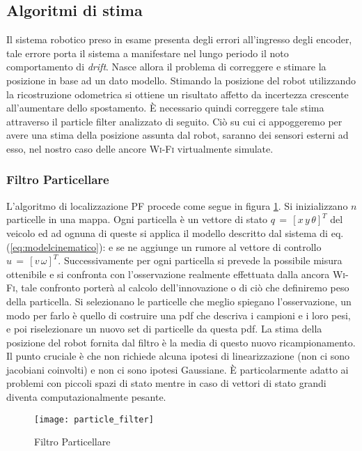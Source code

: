 \subsection{Algoritmi di stima}
Il sistema robotico preso in esame presenta degli errori all'ingresso degli
encoder, tale errore porta il sistema a manifestare nel lungo periodo il noto
comportamento di \emph{drift}.
Nasce allora il problema di correggere e stimare la posizione in base ad un dato
modello.
Stimando la posizione del robot utilizzando la ricostruzione odometrica si
ottiene un risultato affetto da incertezza crescente all'aumentare dello
spostamento.
È necessario quindi correggere tale stima attraverso il particle
filter\cite{newman2003} analizzato di seguito.
Ciò su cui ci appoggeremo per avere una stima della posizione assunta dal robot,
saranno dei sensori esterni ad esso, nel nostro caso delle ancore \textsc{Wi-Fi}
virtualmente simulate.

\subsubsection{Filtro Particellare}
L'algoritmo di localizzazione PF procede come segue in figura
\ref{fig:particle filter}. Si inizializzano $n$ particelle in una mappa.
Ogni particella è un vettore di stato $q\,=\,[x \, y \, \theta]^{T}$ del veicolo
ed ad ognuna di queste si applica il modello descritto dal sistema di eq.
(\ref{eq:modelcinematico}): e se ne aggiunge un rumore al vettore di
controllo $u\,=\,[v \, \omega]^{T}$.
Successivamente per ogni particella si prevede la possibile misura ottenibile e
si confronta con l'osservazione realmente effettuata dalla ancora
\textsc{Wi-Fi}, tale confronto porterà al calcolo dell'innovazione o di ciò che
definiremo peso della particella.
Si selezionano le particelle che meglio spiegano l'osservazione, un modo per
farlo è quello di costruire una pdf che descriva i campioni e i loro pesi, e
poi riselezionare un nuovo set di particelle da questa pdf.
La stima della posizione del robot fornita dal filtro è la media di questo
nuovo ricampionamento.
Il punto cruciale è che non richiede alcuna ipotesi di linearizzazione (non ci
sono jacobiani coinvolti) e non ci sono ipotesi Gaussiane. È particolarmente
adatto ai problemi con piccoli spazi di stato mentre in caso di vettori di
stato grandi diventa computazionalmente pesante.

\begin{figure}[!htb]
  \texttt{[image: particle\_filter]}
  \caption{Filtro Particellare}
  \label{fig:particle filter}
\end{figure}
